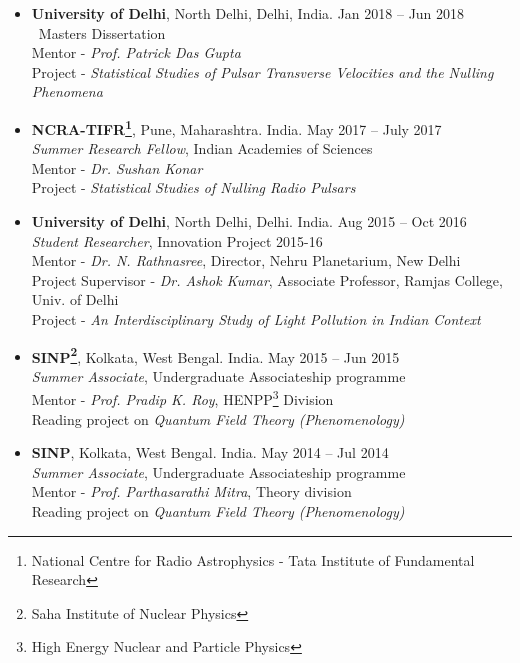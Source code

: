 \begin{itemize}
\item {\bf University of Delhi}, North Delhi, Delhi, India. \hfill{Jan 2018 -- Jun 2018}\\
{\ Masters Dissertation}\\
Mentor - {\em Prof. Patrick Das Gupta}\\
Project - {\em Statistical Studies of Pulsar Transverse Velocities and the Nulling Phenomena}

\item {\bf NCRA-TIFR\footnote{National Centre for Radio Astrophysics - Tata Institute of Fundamental Research}}, Pune, Maharashtra. India. \hfill{May 2017 -- July 2017}\\
{\em Summer Research Fellow}, Indian Academies of Sciences\\
Mentor - {\em Dr. Sushan Konar}\\
Project - {\em Statistical Studies of Nulling Radio Pulsars}

\item {\bf University of Delhi}, North Delhi, Delhi. India. \hfill{Aug 2015 -- Oct 2016}\\
{\em Student Researcher}, Innovation Project 2015-16\\
Mentor - {\em Dr. N. Rathnasree}, Director, Nehru Planetarium, New Delhi\\
Project Supervisor - {\em Dr. Ashok Kumar}, Associate Professor, Ramjas College, Univ. of Delhi\\
Project - {\em An Interdisciplinary Study of Light Pollution in Indian Context}

\item {\bf SINP\footnote{Saha Institute of Nuclear Physics}}, Kolkata, West Bengal. India. \hfill{May 2015 -- Jun 2015}\\
{\em Summer Associate}, Undergraduate Associateship programme\\
Mentor - {\em Prof. Pradip K. Roy}, HENPP\footnote{High Energy Nuclear and Particle Physics} Division\\
Reading project on  {\em Quantum Field Theory (Phenomenology)}

\item {\bf SINP}, Kolkata, West Bengal. India. \hfill{May 2014 -- Jul 2014}\\
{\em Summer Associate}, Undergraduate Associateship programme\\
Mentor - {\em Prof. Parthasarathi Mitra}, Theory division\\
Reading project on  {\em Quantum Field Theory (Phenomenology)}
\end{itemize}